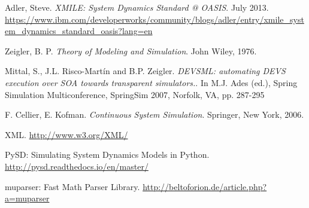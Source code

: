 \begin{thebibliography}{9}

  Adler, Steve. \textit{XMILE: System Dynamics Standard @ OASIS}. July 2013.   \url{https://www.ibm.com/developerworks/community/blogs/adler/entry/xmile_system_dynamics_standard_oasis?lang=en}

  Zeigler, B. P. \textit{Theory of Modeling and Simulation}. John Wiley, 1976.

  Mittal, S., J.L. Risco-Martín and B.P. Zeigler. \textit{DEVSML: automating DEVS execution over SOA towards transparent simulators.}. In M.J. Ades (ed.), Spring Simulation Multiconference, SpringSim 2007, Norfolk, VA, pp. 287-295

 F. Cellier, E. Kofman. \textit{Continuous System Simulation}. Springer, New York, 2006.

  XML. \url{http://www.w3.org/XML/}
 
 PySD: Simulating System Dynamics Models in Python. \url{http://pysd.readthedocs.io/en/master/}
 
 muparser: Fast Math Parser Library. \url{http://beltoforion.de/article.php?a=muparser}

\end{thebibliography}